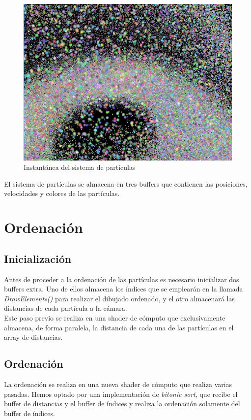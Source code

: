\documentclass[10pt,oneside,a4paper]{article}
\begin{document}
\begin{figure}[h!tbp]
\centering
\includegraphics[width=.8\linewidth]{img/particles.png}
\caption{Instantánea del sistema de partículas}
\end{figure}

El sistema de partículas se almacena en tres buffers que contienen las posiciones, velocidades y colores de las partículas.

\section{Ordenación}
\subsection{Inicialización}
Antes de proceder a la ordenación de las partículas es necesario inicializar dos buffers extra. Uno de ellos almacena los índices que se emplearán en la llamada \textit{DrawElements()} para realizar el dibujado ordenado, y el otro almacenará las distancias de cada partícula a la cámara.\\

Este paso previo se realiza en una shader de cómputo que exclusivamente almacena, de forma paralela, la distancia de cada una de las partículas en el array de distancias.

\subsection{Ordenación}
La ordenación se realiza en una nueva shader de cómputo que realiza varias pasadas. Hemos optado por una implementación de \textit{bitonic sort}, que recibe el buffer de distancias y el buffer de índices y realiza la ordenación solamente del buffer de índices.\\
\end{document}

